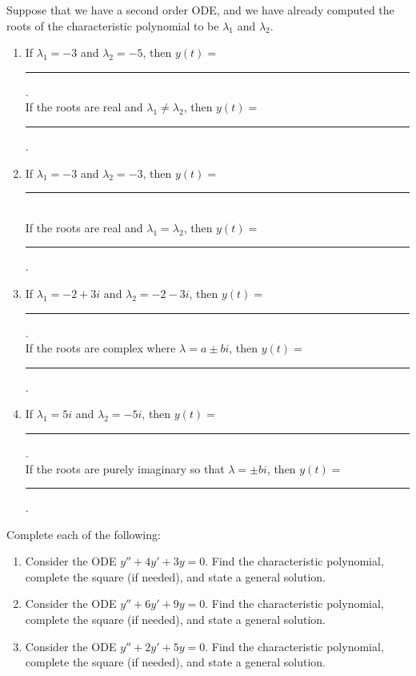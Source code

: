 \begin{problem}
 Suppose that we have a second order ODE, and we have already computed the roots of the characteristic polynomial to be $\lambda_1$ and $\lambda_2$. 
\begin{enumerate}
 \item If $\lambda_1=-3$ and $\lambda_2=-5$, then $y(t) = $\rule{1in}{.5pt}.\\
 If the roots are real and $\lambda_1 \neq \lambda_2$, then $y(t) = $\rule{1in}{.5pt}.
 \item If $\lambda_1=-3$ and $\lambda_2=-3$, then $y(t) = $\rule{1in}{.5pt}\\
 If the roots are real and $\lambda_1  =   \lambda_2$, then $y(t) = $\rule{1in}{.5pt}.
 \item If $\lambda_1 = -2+3i$ and $\lambda_2=-2-3i$, then $y(t) = $\rule{1in}{.5pt}. \\
 If the roots are complex where $\lambda = a\pm bi$, then $y(t) = $\rule{1in}{.5pt}.
 \item If $\lambda_1 = 5i$ and $\lambda_2=-5i$, then $y(t) = $\rule{1in}{.5pt}. \\
 If the roots are purely imaginary so that $\lambda = \pm bi$, then $y(t) = $\rule{1in}{.5pt}.
\end{enumerate}

\end{problem}


\begin{problem}
Complete each of the following:
\begin{enumerate}
 \item Consider the ODE $y''+4y'+3y=0$. Find the characteristic polynomial, complete the square (if needed), and state a general solution. 
 \item 
{}%
Consider the ODE $y''+6y'+9y=0$. Find the characteristic polynomial, complete the square (if needed), and state a general solution. 
 \item
{}%
 Consider the ODE $y''+2y'+5y=0$. Find the characteristic polynomial, complete the square (if needed), and state a general solution. 
\end{enumerate}
\end{problem}







